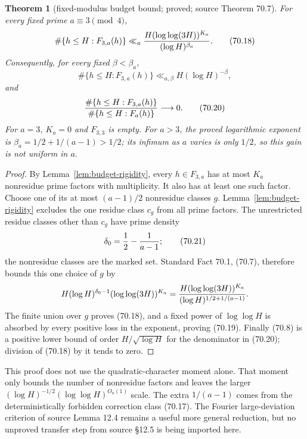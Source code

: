 \documentclass[10pt,reqno]{amsart}
\newtheorem{theorem}{Theorem}[section]
\theoremstyle{definition}
\newcommand{\1}{\mathbf 1}
\begin{document}
\begin{theorem}[fixed-modulus budget bound; proved; source Theorem 70.7]\label{thm:fixed-modulus-budget}  For every fixed
prime $a\equiv3\pmod4$,
\begin{equation}
 \#\{h\leq H:F_{3,a}(h)\}
 \ll_a {H(\log\log(3H))^{K_a}\over(\log H)^{\beta_a}}.     \tag{70.18}
\end{equation}
Consequently, for every fixed $\beta<\beta_a$,
\begin{equation}
             \#\{h\leq H:F_{3,a}(h)\}
                    \ll_{a,\beta}H(\log H)^{-\beta},      \tag{70.19}
\end{equation}
and
\begin{equation}
 {\#\{h\leq H:F_{3,a}(h)\}
  \over \#\{h\leq H:F_a(h)\}}\longrightarrow0.           \tag{70.20}
\end{equation}
For $a=3$, $K_a=0$ and $F_{3,3}$ is empty.  For $a>3$, the
proved logarithmic exponent is
$\beta_a=1/2+1/(a-1)>1/2$; its infimum as $a$ varies is only $1/2$,
so this gain is not uniform in $a$.

\end{theorem}
\begin{proof} By Lemma~\ref{lem:budget-rigidity}, every $h\in F_{3,a}$ has at most $K_a$
nonresidue prime factors with multiplicity.  It also has at least one such
factor.  Choose one of its at most $(a-1)/2$ nonresidue classes $g$.
Lemma~\ref{lem:budget-rigidity} excludes the one residue class $c_g$ from all prime factors.
The unrestricted residue classes other than $c_g$ have prime density
\begin{equation}
             \delta_0={1\over2}-{1\over a-1};             \tag{70.21}
\end{equation}
the nonresidue classes are the marked set.  Standard Fact 70.1, (70.7),
therefore bounds this one choice of $g$ by
\[
 H(\log H)^{\delta_0-1}(\log\log(3H))^{K_a}
 ={H(\log\log(3H))^{K_a}\over(\log H)^{1/2+1/(a-1)}}.
\]
The finite union over $g$ proves (70.18), and a fixed power of
$\log\log H$ is absorbed by every positive loss in the exponent, proving
(70.19).  Finally (70.8) is a positive lower bound of order
$H/\sqrt{\log H}$ for the denominator in (70.20); division of (70.18)
by it tends to zero.
\end{proof}

This proof does not use the quadratic-character moment alone.  That moment
only bounds the number of nonresidue factors and leaves the larger
$(\log H)^{-1/2}(\log\log H)^{O_a(1)}$ scale.  The extra
$1/(a-1)$ comes from the deterministically forbidden correction class
(70.17).  The Fourier large-deviation criterion of source Lemma 12.4 remains a useful
more general reduction, but no unproved transfer step from source \S12.5 is being
imported here.
\end{document}
